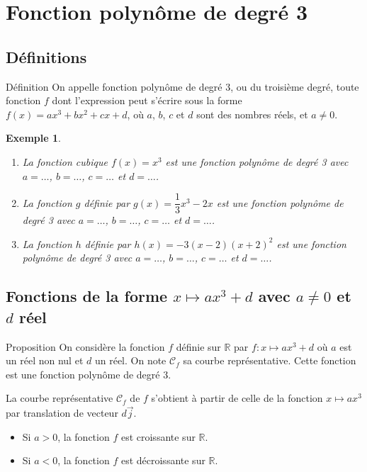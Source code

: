 \documentclass[11pt,a4paper]{article}
\def\R{{\mathbb R}}
\newcommand{\VE}[1]{\overrightarrow{#1}}
\theoremstyle{break}
\newtheorem{Ex}{Exemple}
\begin{document}
	\section{Fonction polynôme de degré 3}
	\subsection{Définitions}
	\begin{bclogo}[couleur = yellow!30,arrondi =0.1,logo =\bcbook]{Définition}
		On appelle fonction polyn\^ome de degré 3, 
		ou du troisième degré, toute fonction $f$ dont l'expression 
		peut s'écrire sous la forme 
		$f(x)=ax^3+bx^2+cx+d$, 
		où $a$, $b$, $c$ et $d$ sont des nombres réels, et $a\not=0$. 
	\end{bclogo}
	\begin{Ex}
		\begin{enumerate}
			\item 	La fonction cubique $f(x)=x^3$ est une fonction polynôme de degré 3 avec $a=\dots$, $b=\dots$, $c=\dots$ et $d=\dots$.
			\item La fonction $g$ définie par $g(x)=\dfrac13x^3-2x$ est une fonction polynôme de degré 3 avec $a=\dots$, $b=\dots$, $c=\dots$ et $d=\dots$.
			\item La fonction $h$ définie par $h(x)=-3(x-2)(x+2)^2$ est une fonction polynôme de degré 3 avec $a=\dots$, $b=\dots$, $c=\dots$ et $d=\dots$.
			\bigskip
		\end{enumerate}
		
	\end{Ex}
	\subsection{Fonctions de la forme $x \mapsto ax^3+d$ avec $a\neq 0$ et $d$ réel} 
	\begin{bclogo}[couleur = yellow!30,arrondi =0.1,logo =\bcbook]{Proposition}	
	On considère la fonction $f$ définie sur $\R$ par $f:x \mapsto ax^3+d$ où $a$ est un réel non nul et $d$ un réel. On note $\mathcal{C}_f$ sa courbe représentative. Cette fonction est une fonction polynôme de degré 3.
	
	
	
	\begin{minipage}{0.5\textwidth}
		La courbe représentative $\mathcal{C}_f$ de $f$ s'obtient à partir de celle de la fonction $x \mapsto ax^3$ par translation de vecteur $d\VE{j}$.
		
		\begin{itemize}
			\item Si $a>0$, la fonction $f$ est croissante sur $\R$.
			\item Si $a<0$, la fonction $f$ est décroissante sur $\R$.
		\end{itemize}	
	\end{minipage}
	
\end{bclogo}
\end{document}
